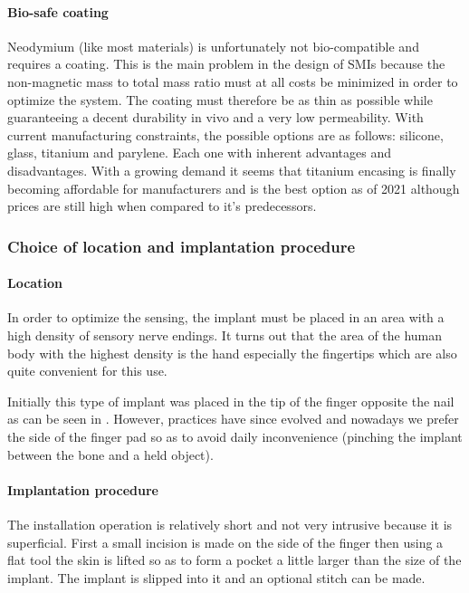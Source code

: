 \documentclass[10pt,journal,compsoc]{IEEEtran}
\begin{document}
			\paragraph{Bio-safe coating}
			Neodymium (like most materials) is unfortunately not bio-compatible and requires a coating. This is the main problem in the design of SMIs because the non-magnetic mass to total mass ratio must at all costs be minimized in order to optimize the system. The coating must therefore be as thin as possible while guaranteeing a decent durability in vivo and a very low permeability. With current manufacturing constraints, the possible options are as follows: silicone, glass, titanium and parylene. Each one with inherent advantages and disadvantages. With a growing demand it seems that titanium encasing is finally becoming affordable for manufacturers and is the best option as of 2021 although prices are still high when compared to it's predecessors.
			
		\subsubsection{Choice of location and implantation procedure} 
			\paragraph{Location}
			In order to optimize the sensing, the implant must be placed in an area with a high density of sensory nerve endings. It turns out that the area of the human body with the highest density is the hand especially the fingertips which are also quite convenient for this use.
			
			Initially this type of implant was placed in the tip of the finger opposite the nail as can be seen in \cite{hameed2010ieee}. However, practices have since evolved and nowadays we prefer the side of the finger pad so as to avoid daily inconvenience (pinching the implant between the bone and a held object).
			\paragraph{Implantation procedure}
			The installation operation is relatively short and not very intrusive because it is superficial. First a small incision is made on the side of the finger then using a flat tool the skin is lifted so as to form a pocket a little larger than the size of the implant. The implant is slipped into it and an optional stitch can be made.
			
\end{document}
